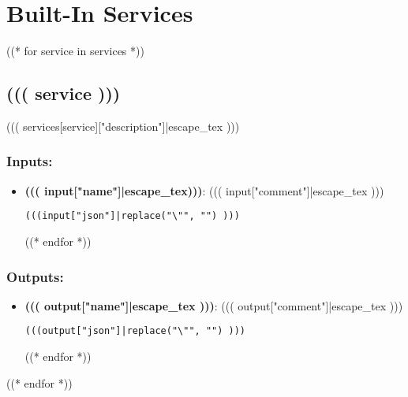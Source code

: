 \section{Built-In Services}
\label{ch:builtinservices}

((* for service in services *))
\subsection{((( service )))}
\label{ch:builtinservices:((( service )))}
((( services[service]["description"]|escape_tex )))
\subsubsection*{Inputs:}
\begin{itemize}
  ((* for input in services[service]["inputs"] *))
  \item \textbf{((( input["name"]|escape_tex)))}: ((( input["comment"]|escape_tex )))
\begin{lstlisting}
(((input["json"]|replace("\"", "") )))
\end{lstlisting}
  ((* endfor *))
\end{itemize}

\subsubsection*{Outputs:}
\begin{itemize}
  ((* for output in services[service]["outputs"] *))
  \item \textbf{((( output["name"]|escape_tex )))}: ((( output["comment"]|escape_tex )))
\begin{lstlisting}
(((output["json"]|replace("\"", "") )))
\end{lstlisting}
  ((* endfor *))
\end{itemize}

((* endfor *))
